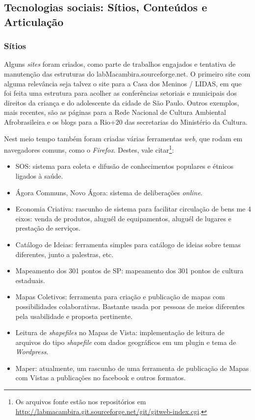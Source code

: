    \subsection{Tecnologias sociais: Sítios, Conteúdos e Articulação}

      \subsubsection{Sítios}

        Alguns \emph{sites} foram criados, como parte de trabalhos engajados e tentativa de manutenção das estruturas do labMacambira.sourceforge.net. O primeiro site com alguma relevância seja talvez o site para a Casa dos Meninos / LIDAS, em que foi feita uma estrutura para acolher as conferências setoriais e municipais dos direitos da criança e do adolescente da cidade de São Paulo. Outros exemplos, mais recentes, são as páginas para a Rede Nacional de Cultura Ambiental Afrobrasileira e os blogs para a Rio+20 das secretarias do Ministério da Cultura.

        Nest meio tempo também foram criadas várias ferramentas \emph{web}, que rodam em navegadores comuns, como o \emph{Firefox}. Destes, vale citar\footnote{Os arquivos fonte estão nos repositórios em \url{http://labmacambira.git.sourceforge.net/git/gitweb-index.cgi}.}:
\begin{itemize}
    \item SOS: sistema para coleta e difusão de conhecimentos populares e étnicos ligados à saúde.
    \item Ágora Communs, Novo Ágora: sistema de deliberações \emph{online}.
    \item Economia Criativa: rascunho de sistema para facilitar circulação de bens me 4 eixos: venda de produtos, aluguél de equipamentos, aluguél de lugares e prestação de serviços.
    \item Catálogo de Ideias: ferramenta simples para catálogo de ideias sobre temas diferentes, junto a palestras, etc.
    \item Mapeamento dos 301 pontos de SP: mapeamento dos 301 pontos de cultura estaduais.
    \item Mapas Coletivos: ferramenta para criação e publicação de mapas com possibilidades colaborativas. Bastante usada por pessoas de meios diferentes pela usabilidade e proposta pertinente.
    \item Leitura de \emph{shapefiles} no Mapas de Vista: implementação de leitura de arquivos do tipo \emph{shapefile} com dados geográficos em um plugin e tema de \emph{Wordpress}.
    \item Maper: atualmente, um rascunho de uma ferramenta de publicação de Mapas com Vistas a publicações no facebook e outros formatos.
\end{itemize}

